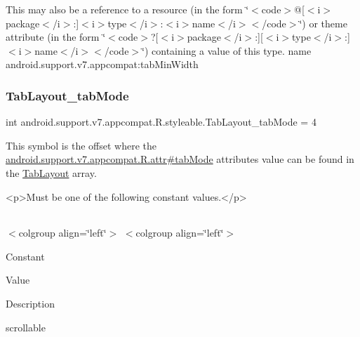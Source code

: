 This may also be a reference to a resource (in the form \char`\"{}$<$code$>$@\mbox{[}$<$i$>$package$<$/i$>$\+:\mbox{]}$<$i$>$type$<$/i$>$\+:$<$i$>$name$<$/i$>$$<$/code$>$\char`\"{}) or theme attribute (in the form \char`\"{}$<$code$>$?\mbox{[}$<$i$>$package$<$/i$>$\+:\mbox{]}\mbox{[}$<$i$>$type$<$/i$>$\+:\mbox{]}$<$i$>$name$<$/i$>$$<$/code$>$\char`\"{}) containing a value of this type.  name android.\+support.\+v7.\+appcompat\+:tab\+Min\+Width \mbox{\label{classandroid_1_1support_1_1v7_1_1appcompat_1_1R_1_1styleable_a33c64cec340e2fdc2aa5d7139637c920}} 
\subsubsection{\texorpdfstring{Tab\+Layout\+\_\+tab\+Mode}{TabLayout\_tabMode}}
{\footnotesize\ttfamily int android.\+support.\+v7.\+appcompat.\+R.\+styleable.\+Tab\+Layout\+\_\+tab\+Mode = 4\hspace{0.3cm}{\ttfamily [static]}}

This symbol is the offset where the \hyperlink{classandroid_1_1support_1_1v7_1_1appcompat_1_1R_1_1attr_aa0a566b845b8df7ff84ec70c2aadf43f}{android.\+support.\+v7.\+appcompat.\+R.\+attr\#tab\+Mode} attribute\textquotesingle{}s value can be found in the \hyperlink{classandroid_1_1support_1_1v7_1_1appcompat_1_1R_1_1styleable_a3c85d0c4cebbccf5b1a16ecfe13938ca}{Tab\+Layout} array.

\begin{DoxyVerb}      <p>Must be one of the following constant values.</p>
\end{DoxyVerb}
 \tabulinesep=1mm
\begin{longtabu} spread 0pt [c]{*{0}{|X[-1]}|}
\hline
\end{longtabu}
$<$colgroup align=\char`\"{}left\char`\"{}$>$ $<$colgroup align=\char`\"{}left\char`\"{}$>$ 

Constant

Value

Description 

{\ttfamily scrollable}

